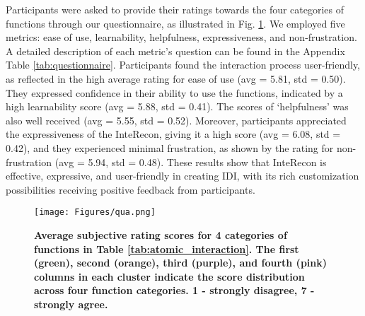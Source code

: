 Participants were asked to provide their ratings towards the four categories of functions through our questionnaire, as illustrated in Fig. \ref{BERT}. 
We employed five metrics: ease of use, learnability, helpfulness, expressiveness, and non-frustration. 
A detailed description of each metric's question can be found in the Appendix Table \ref{tab:questionnaire}. 
Participants found the interaction process user-friendly, as reflected in the high average rating for ease of use (avg = 5.81, std = 0.50). 
They expressed confidence in their ability to use the functions, indicated by a high learnability score (avg = 5.88, std = 0.41). 
The scores of `helpfulness' was also well received (avg = 5.55, std = 0.52). 
Moreover, participants appreciated the expressiveness of the InteRecon, giving it a high score (avg = 6.08, std = 0.42), and they experienced minimal frustration, as shown by the rating for non-frustration (avg = 5.94, std = 0.48). 
These results show that InteRecon is effective, expressive, and user-friendly in creating IDI, with its rich customization possibilities receiving positive feedback from participants. 




\begin{figure}[tbh!]
     \centering
     \texttt{[image: Figures/qua.png]}
     \vspace{-2ex}
     \caption{\textbf{Average subjective rating scores for 4 categories of functions in Table \ref{tab:atomic_interaction}. The first (green), second (orange), third (purple), and fourth (pink) columns in each cluster indicate the score distribution across four function categories. 1 - strongly disagree, 7 - strongly agree.}}
     \label{BERT}
\end{figure}



